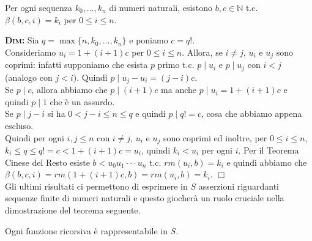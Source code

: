 \begin{lem}
Per ogni sequenza $k_{0},\ldots, k_{n}$ di numeri naturali, esistono $b, c \in \mathbb{N}$ t.c. $\beta(b,c,i)=k_{i}$ per $0\leq i \leq n$.
\end{lem}

\textsc{\textbf{Dim:}} Sia $q= \max\{n, k_{0},\ldots,k_{n}\}$ e poniamo $c=q!$. \\Consideriamo $u_{i}=1+(i+1)c$ per $0\leq i\leq n$.
Allora, se $i\neq j$, $u_{i}$ e $u_{j}$ sono coprimi: infatti supponiamo che esista $p$ primo t.c. $p\mid u_{i}$ e $p\mid u_{j}$ con $i<j$ (analogo con $j<i$). Quindi $p\mid u_{j}-u_{i}=(j-i)c$.\\
Se $p\mid c$, allora abbiamo che $p\mid (i+1)c$ ma anche $p\mid u_{i}=1+(i+1)c$ e quindi $p\mid 1$ che \`e un assurdo.\\
Se $p\mid j-i$ si ha $0<j-i\leq n\leq q$ e quindi $p\mid q!=c$, cosa che abbiamo appena escluso.\\
Quindi per ogni $i,j\leq n$ con $i\neq j$, $u_{i}$ e $u_{j}$ sono coprimi ed inoltre, per $0\leq i\leq n$, $k_{i}\leq q\leq q!= c<1+(i+1)c=u_{i}$, quindi $k_{i}<u_{i}$ per ogni $i$. Per il Teorema Cinese del Resto esiste $b<u_{0}u_{1}\cdot\cdot\cdot u_{n}$ t.c. $rm(u_{i}, b)=k_{i}$ e quindi abbiamo che $\beta(b,c,i)=rm(1+(i+1)c,b)=rm(u_{i},b)=k_{i}$.
 $\Box$\\



Gli ultimi risultati ci permettono di esprimere in $S$ asserzioni riguardanti sequenze finite di numeri naturali e questo giocher\`a un ruolo cruciale nella dimostrazione del teorema seguente.

\begin{thm}
Ogni funzione ricorsiva \`e rappresentabile in $S$.
\end{thm}

